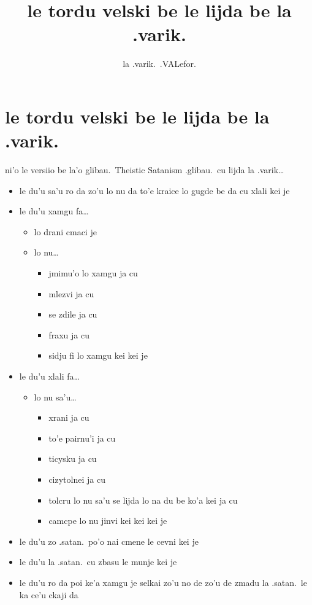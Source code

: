 \documentclass{article}
\title{le tordu velski be le lijda be la .varik.}
\author{la .varik.\ .VALefor.}
\begin{document}
\maketitle

\section{le tordu velski be le lijda be la .varik.}

ni'o le versiio be la'o glibau.\ Theistic Satanism .glibau.\ cu lijda la .varik\ldots

\begin{itemize}
	\item le du'u sa'u ro da zo'u lo nu da to'e kraice lo gugde be da cu xlali kei je
	\item le du'u xamgu fa\ldots{}
	\begin{itemize}
		\item lo drani cmaci je
		\item lo nu\ldots{}
		\begin{itemize}
			\item jmimu'o lo xamgu ja cu
			\item mlezvi ja cu
			\item se zdile ja cu
			\item fraxu ja cu
			\item sidju fi lo xamgu kei kei je
		\end{itemize}
	\end{itemize}
	\item le du'u xlali fa\ldots{}
	\begin{itemize}
		\item lo nu sa'u\ldots{}
		\begin{itemize}
			\item xrani ja cu
			\item to'e pairnu'i ja cu
			\item ticysku ja cu
			\item cizytolnei ja cu
			\item tolcru lo nu sa'u se lijda lo na du be ko'a kei ja cu
			\item camcpe lo nu jinvi kei kei kei je
		\end{itemize}
	\end{itemize}
	\item le du'u zo .satan.\ po'o nai cmene le cevni kei je
	\item le du'u la .satan.\ cu zbasu le munje kei je
	\item le du'u ro da poi ke'a xamgu je selkai zo'u no de zo'u de zmadu la .satan.\ le ka ce'u ckaji da
\end{itemize}
\end{document}
